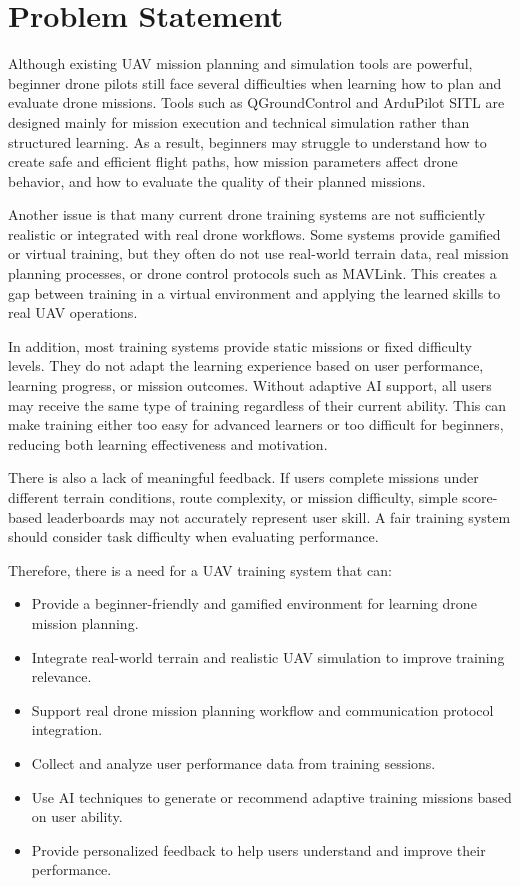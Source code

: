 \section{Problem Statement}
\label{section:problem-statement}

Although existing UAV mission planning and simulation tools are powerful, beginner drone pilots still face several difficulties when learning how to plan and evaluate drone missions. Tools such as QGroundControl and ArduPilot SITL are designed mainly for mission execution and technical simulation rather than structured learning. As a result, beginners may struggle to understand how to create safe and efficient flight paths, how mission parameters affect drone behavior, and how to evaluate the quality of their planned missions.

Another issue is that many current drone training systems are not sufficiently realistic or integrated with real drone workflows. Some systems provide gamified or virtual training, but they often do not use real-world terrain data, real mission planning processes, or drone control protocols such as MAVLink. This creates a gap between training in a virtual environment and applying the learned skills to real UAV operations.

In addition, most training systems provide static missions or fixed difficulty levels. They do not adapt the learning experience based on user performance, learning progress, or mission outcomes. Without adaptive AI support, all users may receive the same type of training regardless of their current ability. This can make training either too easy for advanced learners or too difficult for beginners, reducing both learning effectiveness and motivation.

There is also a lack of meaningful feedback. If users complete missions under different terrain conditions, route complexity, or mission difficulty, simple score-based leaderboards may not accurately represent user skill. A fair training system should consider task difficulty when evaluating performance.


Therefore, there is a need for a UAV training system that can:

\begin{itemize}
    \item Provide a beginner-friendly and gamified environment for learning drone mission planning.
    \item Integrate real-world terrain and realistic UAV simulation to improve training relevance.
    \item Support real drone mission planning workflow and communication protocol integration.
    \item Collect and analyze user performance data from training sessions.
    \item Use AI techniques to generate or recommend adaptive training missions based on user ability.
    \item Provide personalized feedback to help users understand and improve their performance.
\end{itemize}

